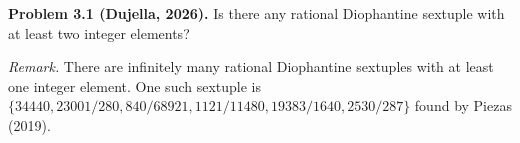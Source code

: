 \textbf{Problem 3.1 (Dujella, 2026).} Is there any rational Diophantine sextuple with at least two integer elements?

\medskip

\textit{Remark.} There are infinitely many rational Diophantine sextuples with at least one integer element. One such sextuple is $\{34440, 23001/280, 840/68921, 1121/11480, 19383/1640, 2530/287\}$ found by Piezas (2019).

